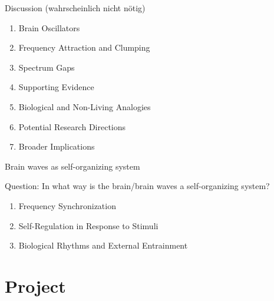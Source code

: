 \documentclass[xetex,notheorems,hyperref={pdfpagelabels=true},xcolor=table]{beamer}
\theoremstyle{plain}
\theoremstyle{definition}
\theoremstyle{example}
\theoremstyle{example}
\begin{document}
\begin{frame}{Discussion (wahrscheinlich nicht nötig)}
    \begin{enumerate}
        \item Brain Oscillators
        \item Frequency Attraction and Clumping
        \item Spectrum Gaps
        \item Supporting Evidence
        \item Biological and Non-Living Analogies
        \item Potential Research Directions
        \item Broader Implications
        
    \end{enumerate}
    
\end{frame}

\begin{frame}{Brain waves as self-organizing system}
    \begin{block}{Question: In what way is the brain/brain waves a self-organizing system?}
        \begin{enumerate}
            \item Frequency Synchronization
            \item Self-Regulation in Response to Stimuli
            \item Biological Rhythms and External Entrainment
        \end{enumerate}
    \end{block}
    
\end{frame}



\section{Project}
\end{document}
